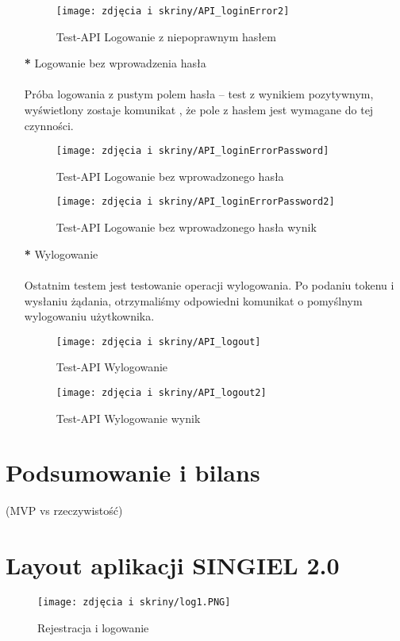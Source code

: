 \documentclass[12pt,a4paper]{article}
\begin{document}
\begin{itemize}
\begin{figure}[H]
\end{figure}
\begin{figure}[H]
\centering
\texttt{[image: zdjęcia i skriny/API\_loginError2]}
\caption{Test-API Logowanie z niepoprawnym hasłem}
\end{figure}

\item [\textbf{*}] Logowanie bez wprowadzenia hasła\\
\\
Próba logowania z pustym polem hasła – test z wynikiem pozytywnym, wyświetlony zostaje komunikat , że pole z hasłem jest wymagane do tej czynności.
\begin{figure}[H]
\centering
\texttt{[image: zdjęcia i skriny/API\_loginErrorPassword]}
\caption{Test-API Logowanie bez wprowadzonego hasła}

\end{figure}
\begin{figure}[H]
\centering
\texttt{[image: zdjęcia i skriny/API\_loginErrorPassword2]}
\caption{Test-API Logowanie  bez wprowadzonego hasła wynik}
\end{figure}

\item [\textbf{*}] Wylogowanie\\
\\
Ostatnim testem jest testowanie operacji wylogowania. Po podaniu tokenu i wysłaniu żądania, otrzymaliśmy odpowiedni komunikat o pomyślnym wylogowaniu użytkownika.
\begin{figure}[H]
\centering
\texttt{[image: zdjęcia i skriny/API\_logout]}
\caption{Test-API Wylogowanie}
\end{figure}


\begin{figure}[H]
\centering
\texttt{[image: zdjęcia i skriny/API\_logout2]}
\caption{Test-API Wylogowanie wynik}
\end{figure}
\end{itemize}


\section{Podsumowanie i bilans}
(MVP vs rzeczywistość)





\newpage


\section{Layout aplikacji SINGIEL 2.0}
\begin{figure}[H]
\centering
\texttt{[image: zdjęcia i skriny/log1.PNG]}
\caption{Rejestracja i logowanie}
\end{figure}
\end{document}
